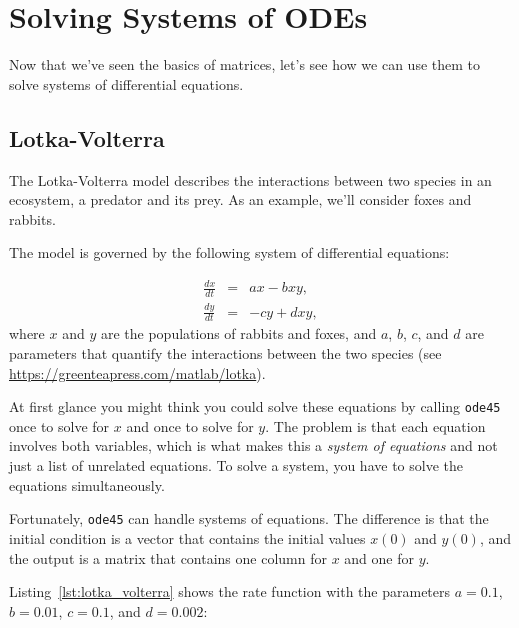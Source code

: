 \section{Solving Systems of ODEs}

Now that we've seen the basics of matrices, let's see how we can use them to solve systems of differential equations.

\subsection{Lotka-Volterra}
\label{lotka}

The Lotka-Volterra model describes the interactions between two
species in an ecosystem, a predator and its prey.  As an example, we'll consider foxes and rabbits.


The model is governed by the following system of differential equations:

\begin{eqnarray*}
    \frac{dx}{dt} &=& a x - b x y  ,       \\
    \frac{dy}{dt} &=& -c y + d x y  ,  
\end{eqnarray*}
%
where $x$ and $y$ are the populations of rabbits and foxes,
and $a$, $b$, $c$, and $d$ are parameters
that quantify the interactions between the two species (see
\url{https://greenteapress.com/matlab/lotka}).

At first glance you might think you could solve these equations by
calling \lstinline{ode45} once to solve for $x$ and
once to solve for $y$.  The problem is that each equation involves
both variables, which is what makes this a {\em system of equations}
and not just a list of unrelated equations.  To solve a system, you
have to solve the equations simultaneously.


Fortunately, \lstinline{ode45} can handle systems of equations.  The
difference is that the initial condition is a vector that contains the
initial values $x(0)$ and $y(0)$, and the output is a matrix
that contains one column for $x$ and one for $y$.


Listing~\ref{lst:lotka_volterra} shows the rate function
with the parameters $a = 0.1$, $b = 0.01$, $c = 0.1$, and $d = 0.002$:

